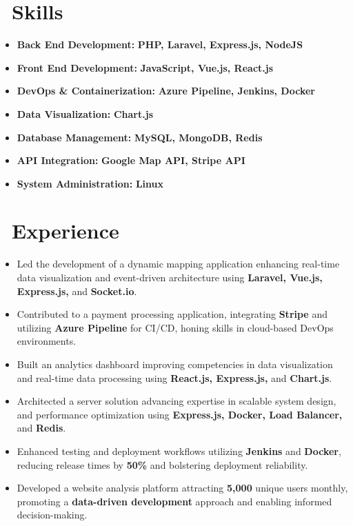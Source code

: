 \documentclass{resume}
\begin{document}



\section{\faCogs\ Skills}
\begin{itemize}[parsep=0.5ex]
  \item \textbf{Back End Development:} \textbf{PHP, Laravel, Express.js, NodeJS}
  \item \textbf{Front End Development:} \textbf{JavaScript, Vue.js, React.js}
  \item \textbf{DevOps \& Containerization:} \textbf{Azure Pipeline, Jenkins, Docker}
  \item \textbf{Data Visualization:} \textbf{Chart.js}
  \item \textbf{Database Management:} \textbf{MySQL, MongoDB, Redis}
  \item \textbf{API Integration:} \textbf{Google Map API, Stripe API}
  \item \textbf{System Administration:} \textbf{Linux}
\end{itemize}


\section{\faUsers\ Experience}
\role{Software Developer}{Full-time}
\begin{itemize}
 \item Led the development of a dynamic mapping application enhancing real-time data visualization and event-driven architecture using \textbf{Laravel, Vue.js, Express.js,} and \textbf{Socket.io}.
 \item Contributed to a payment processing application, integrating \textbf{Stripe} and utilizing \textbf{Azure Pipeline} for CI/CD, honing skills in cloud-based DevOps environments.
 \item Built an analytics dashboard improving competencies in data visualization and real-time data processing using \textbf{React.js, Express.js,} and \textbf{Chart.js}.
 \item Architected a server solution advancing expertise in scalable system design, and performance optimization using \textbf{Express.js, Docker, Load Balancer,} and \textbf{Redis}.
 \item Enhanced testing and deployment workflows utilizing \textbf{Jenkins} and \textbf{Docker}, reducing release times by \textbf{50\%} and bolstering deployment reliability.
 \item Developed a website analysis platform attracting \textbf{5,000} unique users monthly, promoting a \textbf{data-driven development} approach and enabling informed decision-making.
\end{itemize}
\end{document}
